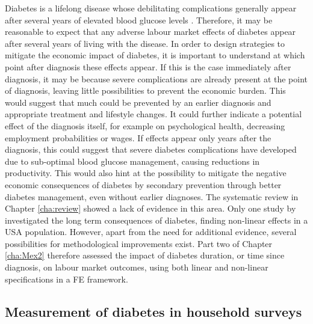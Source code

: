 Diabetes is a lifelong disease whose debilitating complications generally appear after several years of elevated blood glucose levels \parencite{WorldHealthOrganization2016}. Therefore, it may be reasonable to expect that any adverse labour market effects of diabetes appear after several years of living with the disease. In order to design strategies to mitigate the economic impact of diabetes, it is important to understand at which point after diagnosis these effects appear. If this is the case immediately after diagnosis, it may be because severe complications are already present at the point of diagnosis, leaving little possibilities to prevent the economic burden. This would suggest that much could be prevented by an earlier diagnosis and appropriate treatment and lifestyle changes. It could further indicate a potential effect of the diagnosis itself, for example on psychological health, decreasing employment probabilities or wages. If effects appear only years after the diagnosis, this could suggest that severe diabetes complications have developed due to sub-optimal blood glucose management, causing reductions in productivity. This would also hint at the possibility to mitigate the negative economic consequences of diabetes by secondary prevention through better diabetes management, even without earlier diagnoses. The systematic review in Chapter \ref{cha:review} showed a lack of evidence in this area. Only one study by \textcite{Minor2013} investigated the long term consequences of diabetes, finding non-linear effects in a USA population. However, apart from the need for additional evidence, several possibilities for methodological improvements exist. Part two of Chapter \ref{cha:Mex2} therefore assessed the impact of diabetes duration, or time since diagnosis, on labour market outcomes, using both linear and non-linear specifications in a \ac{FE} framework.   

\subsection{Measurement of diabetes in household surveys}

